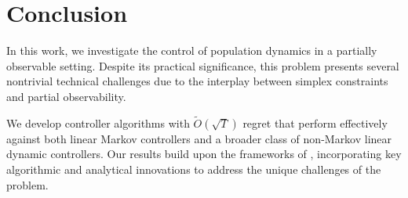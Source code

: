 \section{Conclusion}
In this work, we investigate the control of population dynamics in a partially observable setting. Despite its practical significance, this problem presents several nontrivial technical challenges due to the interplay between simplex constraints and partial observability.

We develop controller algorithms with $\tilde{O}(\sqrt{T})$ regret that perform effectively against both linear Markov controllers and a broader class of non-Markov linear dynamic controllers. Our results build upon the frameworks of \cite{golowich2024online, simchowitz2020improper}, incorporating key algorithmic and analytical innovations to address the unique challenges of the problem.